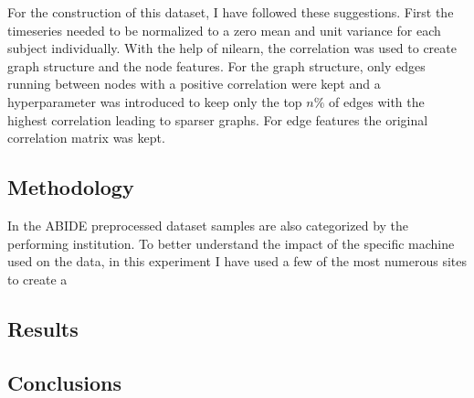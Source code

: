 	For the construction of this dataset, I have followed these suggestions. First the timeseries needed to be normalized to a zero mean and unit variance for each subject individually. With the help of nilearn, the correlation was used to create graph structure and the node features. For the graph structure, only edges running between nodes with a positive correlation were kept and a hyperparameter was introduced to keep only the top $n\%$ of edges with the highest correlation leading to sparser graphs. For edge features the original correlation matrix was kept.
	
	\subsection{Methodology}
	
	In the ABIDE preprocessed dataset samples are also categorized by the performing institution. To better understand the impact of the specific machine used on the data, in this experiment I have used a few of the most numerous sites to create a 
	
	\subsection{Results}
	
	\subsection{Conclusions}